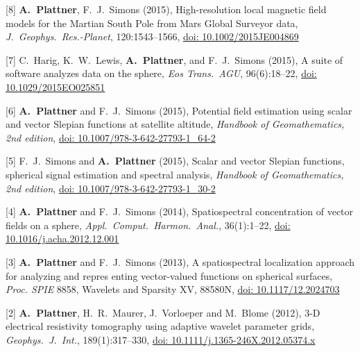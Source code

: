 \documentclass[10pt]{article}
\begin{document}
\spcp
\hspace{-0.5cm}[8] \textbf{A.~Plattner}, F.~J.~Simons (2015),
High-resolution local magnetic field models for the
Martian South Pole
from Mars Global Surveyor data,
\emph{J.~Geophys.~Res.-Planet}, 120:1543--1566,
\href{http://onlinelibrary.wiley.com/doi/10.1002/2015JE004869/abstract}{doi: 10.1002/2015JE004869}

\spcp
\hspace{-0.5cm}[7] C.~Harig, K.~W.~Lewis, \textbf{A.~Plattner}, and F.~J.~Simons (2015),
A suite of software analyzes data on the sphere,
\emph{Eos Trans.~AGU}, 96(6):18--22,
\href{https://eos.org/project-updates/a-suite-of-software-analyzes-data-on-the-sphere-2}{doi: 10.1029/2015EO025851}

\spcp
\hspace{-0.5cm}[6] \textbf{A.~Plattner} and F.~J.~Simons (2015),
Potential field estimation using scalar and vector Slepian functions at satellite altitude,
\emph{Handbook of Geomathematics, 2nd edition},
\href{https://link.springer.com/referenceworkentry/10.1007\%2F978-3-642-27793-1_64-2}{doi: 10.1007/978-3-642-27793-1\_64-2}

\spcp
\hspace{-0.5cm}[5] F.~J.~Simons and \textbf{A.~Plattner} (2015),
Scalar and vector Slepian functions, spherical signal estimation and spectral analysis,
\emph{Handbook of Geomathematics, 2nd edition},
\href{https://link.springer.com/referenceworkentry/10.1007\%2F978-3-642-27793-1_30-2}{doi: 10.1007/978-3-642-27793-1\_30-2}

\spcp
\hspace{-0.5cm}[4] \textbf{A.~Plattner} and F.~J.~Simons (2014),
Spatiospectral concentration of vector fields on a sphere,
\emph{Appl.~Comput.~Harmon.~Anal.}, 36(1):1--22, 
\href{http://www.sciencedirect.com/science/article/pii/S106352031300002X?via\%3Dihub}{doi: 10.1016/j.acha.2012.12.001}

\spcp
\hspace{-0.5cm}[3] \textbf{A.~Plattner} and F.~J.~Simons (2013), 
A spatiospectral localization approach for analyzing and repres enting vector-valued functions on spherical surfaces,
\emph{Proc. SPIE} 8858, Wavelets and Sparsity XV, 88580N,
\href{http://proceedings.spiedigitallibrary.org/proceeding.aspx?articleid=1745029}{doi: 10.1117/12.2024703}

\spcp
\hspace{-0.5cm}[2] \textbf{A.~Plattner}, H.~R.~Maurer, J.~Vorloeper and M.~Blome (2012),
3-D electrical resistivity tomography using adaptive wavelet parameter grids,
\emph{Geophys.~J.~Int.}, 189(1):317--330,
\href{https://academic.oup.com/gji/article-lookup/doi/10.1111/j.1365-246X.2012.05374.x}{doi: 10.1111/j.1365-246X.2012.05374.x}
\end{document}
